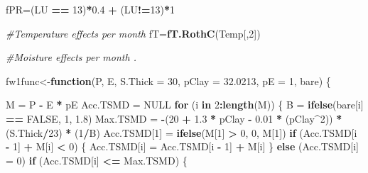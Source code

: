 \documentclass[
  10pt,
  b5paper,
]{book}
\newenvironment{Shaded}{\begin{snugshade}}{\end{snugshade}}
\newcommand{\CommentTok}[1]{\textcolor[rgb]{0.56,0.35,0.01}{\textit{#1}}}
\newcommand{\ControlFlowTok}[1]{\textcolor[rgb]{0.13,0.29,0.53}{\textbf{#1}}}
\newcommand{\DataTypeTok}[1]{\textcolor[rgb]{0.13,0.29,0.53}{#1}}
\newcommand{\DecValTok}[1]{\textcolor[rgb]{0.00,0.00,0.81}{#1}}
\newcommand{\FloatTok}[1]{\textcolor[rgb]{0.00,0.00,0.81}{#1}}
\newcommand{\KeywordTok}[1]{\textcolor[rgb]{0.13,0.29,0.53}{\textbf{#1}}}
\newcommand{\NormalTok}[1]{#1}
\newcommand{\OperatorTok}[1]{\textcolor[rgb]{0.81,0.36,0.00}{\textbf{#1}}}
\newcommand{\OtherTok}[1]{\textcolor[rgb]{0.56,0.35,0.01}{#1}}
\newcommand{\StringTok}[1]{\textcolor[rgb]{0.31,0.60,0.02}{#1}}
\begin{document}
\begin{Shaded}
\begin{Highlighting}[]
\NormalTok{fPR=(LU }\OperatorTok{==}\StringTok{ }\DecValTok{13}\NormalTok{)}\OperatorTok{*}\FloatTok{0.4} \OperatorTok{+}\StringTok{ }\NormalTok{(LU}\OperatorTok{!=}\DecValTok{13}\NormalTok{)}\OperatorTok{*}\DecValTok{1}

\CommentTok{#Temperature effects per month}
\NormalTok{fT=}\KeywordTok{fT.RothC}\NormalTok{(Temp[,}\DecValTok{2}\NormalTok{]) }

\CommentTok{#Moisture effects per month . }

\NormalTok{fw1func<-}\ControlFlowTok{function}\NormalTok{(P, E, }\DataTypeTok{S.Thick =} \DecValTok{30}\NormalTok{, }\DataTypeTok{pClay =} \FloatTok{32.0213}\NormalTok{, }\DataTypeTok{pE =} \DecValTok{1}\NormalTok{, bare) }
\NormalTok{\{}
   
\NormalTok{    M =}\StringTok{ }\NormalTok{P }\OperatorTok{-}\StringTok{ }\NormalTok{E }\OperatorTok{*}\StringTok{ }\NormalTok{pE}
\NormalTok{    Acc.TSMD =}\StringTok{ }\OtherTok{NULL}
    \ControlFlowTok{for}\NormalTok{ (i }\ControlFlowTok{in} \DecValTok{2}\OperatorTok{:}\KeywordTok{length}\NormalTok{(M)) \{}
\NormalTok{ 	B =}\StringTok{ }\KeywordTok{ifelse}\NormalTok{(bare[i] }\OperatorTok{==}\StringTok{ }\OtherTok{FALSE}\NormalTok{, }\DecValTok{1}\NormalTok{, }\FloatTok{1.8}\NormalTok{)}
\NormalTok{	 Max.TSMD =}\StringTok{ }\OperatorTok{-}\NormalTok{(}\DecValTok{20} \OperatorTok{+}\StringTok{ }\FloatTok{1.3} \OperatorTok{*}\StringTok{ }\NormalTok{pClay }\OperatorTok{-}\StringTok{ }\FloatTok{0.01} \OperatorTok{*}\StringTok{ }\NormalTok{(pClay}\OperatorTok{^}\DecValTok{2}\NormalTok{)) }\OperatorTok{*}\StringTok{ }\NormalTok{(S.Thick}\OperatorTok{/}\DecValTok{23}\NormalTok{) }\OperatorTok{*}\StringTok{ }\NormalTok{(}\DecValTok{1}\OperatorTok{/}\NormalTok{B)}
\NormalTok{        Acc.TSMD[}\DecValTok{1}\NormalTok{] =}\StringTok{ }\KeywordTok{ifelse}\NormalTok{(M[}\DecValTok{1}\NormalTok{] }\OperatorTok{>}\StringTok{ }\DecValTok{0}\NormalTok{, }\DecValTok{0}\NormalTok{, M[}\DecValTok{1}\NormalTok{])}
        \ControlFlowTok{if}\NormalTok{ (Acc.TSMD[i }\OperatorTok{-}\StringTok{ }\DecValTok{1}\NormalTok{] }\OperatorTok{+}\StringTok{ }\NormalTok{M[i] }\OperatorTok{<}\StringTok{ }\DecValTok{0}\NormalTok{) \{}
\NormalTok{            Acc.TSMD[i] =}\StringTok{ }\NormalTok{Acc.TSMD[i }\OperatorTok{-}\StringTok{ }\DecValTok{1}\NormalTok{] }\OperatorTok{+}\StringTok{ }\NormalTok{M[i]}
\NormalTok{        \}}
        \ControlFlowTok{else}\NormalTok{ (Acc.TSMD[i] =}\StringTok{ }\DecValTok{0}\NormalTok{)}
        \ControlFlowTok{if}\NormalTok{ (Acc.TSMD[i] }\OperatorTok{<=}\StringTok{ }\NormalTok{Max.TSMD) \{}

\end{Highlighting}
\end{Shaded}
\end{document}

